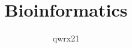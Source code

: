 \documentclass{article}
\title{Bioinformatics}
\author{qwrx21}
\begin{document}
\maketitle
\pagebreak

\section{}


\section{}


\printbibliography
\end{document}

